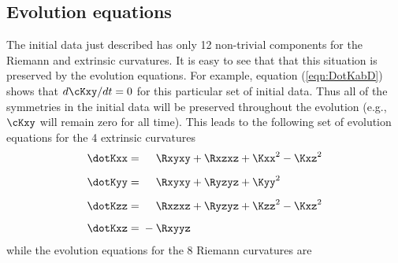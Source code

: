 \documentclass[a4paper,12pt]{article}
\numberwithin{equation}{section}
\begin{document}
\subsection{Evolution equations}
\label{sec:BrillEqtns}

The initial data just described has only 12 non-trivial components for the Riemann and
extrinsic curvatures. It is easy to see that that this situation is preserved by the
evolution equations. For example, equation (\ref{eqn:DotKabD}) shows that $d\cKxy/dt = 0$
for this particular set of initial data. Thus all of the symmetries in the initial data
will be preserved throughout the evolution (e.g., $\cKxy$ will remain zero for all time).
This leads to the following set of evolution equations for the 4 extrinsic curvatures
\bgroup
\def\P{\phantom{{}+{}}}
\def\M{{}-{}}
\begin{align}
   \label{eqn:DotBrillKxx}\dotKxx &= \P \Rxyxy + \Rxzxz + \Kxx^2 - \Kxz^2 \\[5pt]
   \label{eqn:DotBrillKyy}\dotKyy &= \P \Rxyxy + \Ryzyz + \Kyy^2 \\[5pt]
   \label{eqn:DotBrillKzz}\dotKzz &= \P \Rxzxz + \Ryzyz + \Kzz^2 - \Kxz^2 \\[5pt]
   \label{eqn:DotBrillKxz}\dotKxz &= \M \Rxyyz
\end{align}
\egroup
while the evolution equations for the 8 Riemann curvatures are
\end{document}
